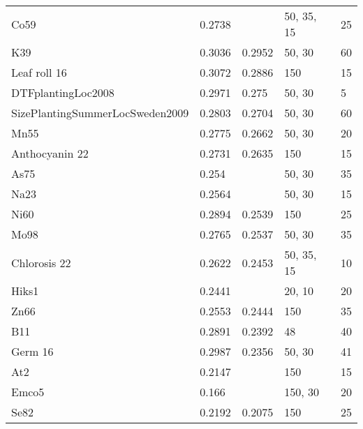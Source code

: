 \begin{longtable}{p{} p{} p{} p{} p{}}
  Co59                               & 0.2738  & \color{red}{0.2953}  & 50, 35, 15   & 25     \\
  K39                                & 0.3036  & 0.2952               & 50, 30       & 60     \\
  Leaf roll 16                       & 0.3072  & 0.2886               & 150          & 15     \\
  DTFplantingLoc2008                 & 0.2971  & 0.275                & 50, 30       & 5      \\
  SizePlantingSummerLocSweden2009    & 0.2803  & 0.2704               & 50, 30       & 60     \\
  Mn55                               & 0.2775  & 0.2662               & 50, 30       & 20     \\
  Anthocyanin 22                     & 0.2731  & 0.2635               & 150          & 15     \\
  As75                               & 0.254   & \color{red}{0.2619}  & 50, 30       & 35     \\
  Na23                               & 0.2564  & \color{red}{0.2598}  & 50, 30       & 15     \\
  Ni60                               & 0.2894  & 0.2539               & 150          & 25     \\
  Mo98                               & 0.2765  & 0.2537               & 50, 30       & 35     \\
  Chlorosis 22                       & 0.2622  & 0.2453               & 50, 35, 15   & 10     \\
  Hiks1                              & 0.2441  & \color{red}{0.2452}  & 20, 10       & 20     \\
  Zn66                               & 0.2553  & 0.2444               & 150          & 35     \\
  B11                                & 0.2891  & 0.2392               & 48           & 40     \\
  Germ 16                            & 0.2987  & 0.2356               & 50, 30       & 41     \\
  At2                                & 0.2147  & \color{red}{0.216}   & 150          & 15     \\
  Emco5                              & 0.166   & \color{red}{0.2101}  & 150, 30      & 20     \\
  Se82                               & 0.2192  & 0.2075               & 150          & 25     \\

\end{longtable}
